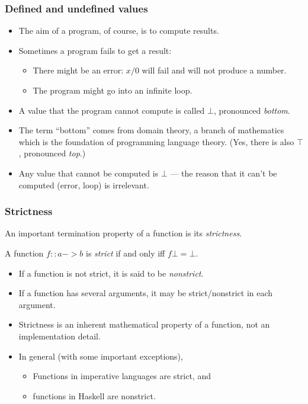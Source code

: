 \documentclass{beamer}
\begin{document}
\begin{frame}[fragile]
\frametitle{Defined and undefined values}

\begin{itemize}
\item The aim of a program, of course, is to compute results.
\item Sometimes a program fails to get a result:
  \begin{itemize}
  \item There might be an error: $x/0$ will fail and will not
    produce a number.
  \item The program might go into an infinite loop.
  \end{itemize}
\item A value that the program cannot compute is called $\bot$,
  pronounced \emph{bottom}.
\item The term ``bottom'' comes from domain theory, a branch of
  mathematics which is the foundation of programming language
  theory.  (Yes, there is also $\top$, pronounced \emph{top}.)
\item Any value that cannot be computed is $\bot$ --- the reason
  that it can't be computed (error, loop) is irrelevant.
\end{itemize}

\end{frame}

\begin{frame}[fragile]
\frametitle{Strictness}

An important termination property of a function is its
\emph{strictness}.

\begin{definition}
  A function $f :: a -> b$ is \emph{strict} if and only iff $f \bot
  = \bot$.
\end{definition}

\begin{itemize}
\item If a function is not strict, it is said to be
  \emph{nonstrict}.
\item If a function has several arguments, it may be
  strict/nonstrict in each argument.
\item Strictness is an inherent mathematical property of a
  function, not an implementation detail.
\item In general (with some important exceptions),
  \begin{itemize}
  \item Functions in imperative languages are strict, and
  \item functions in Haskell are nonstrict.
  \end{itemize}
\end{itemize}

\end{frame}
\end{document}
